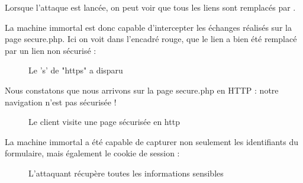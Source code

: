 Lorsque l'attaque est lancée, on peut voir que tous les liens  sont remplacés par .

La machine immortal est donc capable d'intercepter les échanges réalisés sur la page secure.php. Ici on voit dans l'encadré rouge, que le lien  a bien été remplacé par un lien non sécurisé  :

\begin{figure}[H]
  \caption{Le 's' de "https" a disparu}
\end{figure}

Nous constatons que nous arrivons sur la page secure.php en HTTP : notre navigation n'est pas sécurisée !

\begin{figure}[H]
  \caption{Le client visite une page sécurisée en http}
\end{figure}

La machine immortal a été capable de capturer non seulement les identifiants du formulaire, mais également le cookie de session :

\begin{figure}[H]
  \caption{L'attaquant récupère toutes les informations sensibles}
\end{figure}

